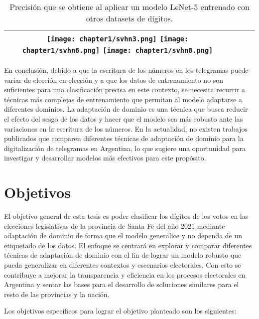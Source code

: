 \begin{table}[H]
\begin{tabular}{c|ccc}
        \texttt{[image: chapter1/svhn3.png]}
        \texttt{[image: chapter1/svhn6.png]}
        \texttt{[image: chapter1/svhn8.png]}                              &                                                   &                                   &                                   \\
        \bottomrule
    \end{tabular}
    \caption{Precisión que se obtiene al aplicar un modelo LeNet-5 entrenado con otros datasets de dígitos.}
    \label{tab:lenet-distintos-datasets}
\end{table}

En conclusión, debido a que la escritura de los números en los telegramas puede variar de elección en elección y a que
los datos de entrenamiento no son suficientes para una clasificación precisa en este contexto, se necesita recurrir a
técnicas más complejas de entrenamiento que permitan al modelo adaptarse a diferentes dominios. La adaptación de
dominio es una técnica que busca reducir el efecto del sesgo de los datos y hacer que el modelo sea más robusto ante
las variaciones en la escritura de los números. En la actualidad, no existen trabajos publicados que comparen
diferentes técnicas de adaptación de dominio para la digitalización de telegramas en Argentina, lo que sugiere una
oportunidad para investigar y desarrollar modelos más efectivos para este propósito.

\section{Objetivos}

El objetivo general de esta tesis es poder clasificar los dígitos de los votos en las elecciones legislativas de la
provincia de Santa Fe del año 2021 mediante adaptación de dominio de forma que el modelo generalice y no dependa de un
etiquetado de los datos. El enfoque se centrará en explorar y comparar diferentes técnicas de adaptación de dominio con
el fin de lograr un modelo robusto que pueda generalizar en diferentes contextos y escenarios electorales. Con esto se
contribuye a mejorar la transparencia y eficiencia en los procesos electorales en Argentina y sentar las bases para el
desarrollo de soluciones similares para el resto de las provincias y la nación.

Los objetivos específicos para lograr el objetivo planteado son los siguientes:

